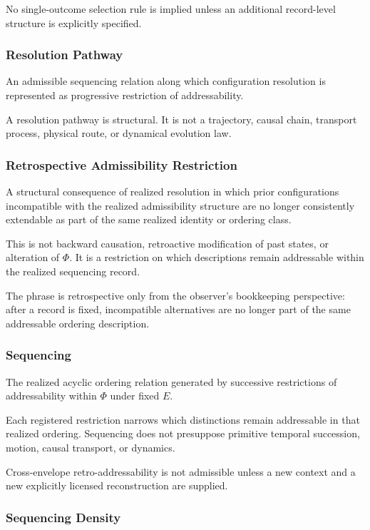 \documentclass[aps,prx,onecolumn,11pt]{revtex4-2}
\theoremstyle{plain}
\theoremstyle{definition}
\theoremstyle{remark}
\begin{document}
No single-outcome selection rule is implied unless an additional
record-level structure is explicitly specified.

\subsubsection*{Resolution Pathway}

An admissible sequencing relation along which configuration resolution
is represented as progressive restriction of addressability.

A resolution pathway is structural. It is not a trajectory, causal
chain, transport process, physical route, or dynamical evolution law.

\subsubsection*{Retrospective Admissibility Restriction}

A structural consequence of realized resolution in which prior
configurations incompatible with the realized admissibility structure
are no longer consistently extendable as part of the same realized
identity or ordering class.

This is not backward causation, retroactive modification of past
states, or alteration of \(\Phi\). It is a restriction on which
descriptions remain addressable within the realized sequencing record.

The phrase is retrospective only from the observer's bookkeeping
perspective: after a record is fixed, incompatible alternatives are no
longer part of the same addressable ordering description.

\subsubsection*{Sequencing}

The realized acyclic ordering relation generated by successive
restrictions of addressability within \(\Phi\) under fixed \(E\).

Each registered restriction narrows which distinctions remain
addressable in that realized ordering. Sequencing does not presuppose
primitive temporal succession, motion, causal transport, or dynamics.

Cross-envelope retro-addressability is not admissible unless a new
context and a new explicitly licensed reconstruction are supplied.

\subsubsection*{Sequencing Density}
\end{document}
